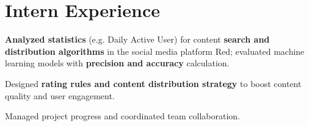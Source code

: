 
\section{\textbf{Intern Experience}}
\resumeSubHeadingListStart

\vspace{-1.0mm}

      \resumeItemListStart
        \item \textbf{Analyzed statistics} (e.g. Daily Active User) for content \textbf{search and distribution algorithms} in the social media platform Red; evaluated machine learning models with \textbf{precision and accuracy} calculation.
        \item Designed \textbf{rating rules and content distribution strategy} to boost content quality and user engagement.
        \item Managed project progress and coordinated team collaboration.
    \resumeItemListEnd
    \vspace{-3mm}

    

